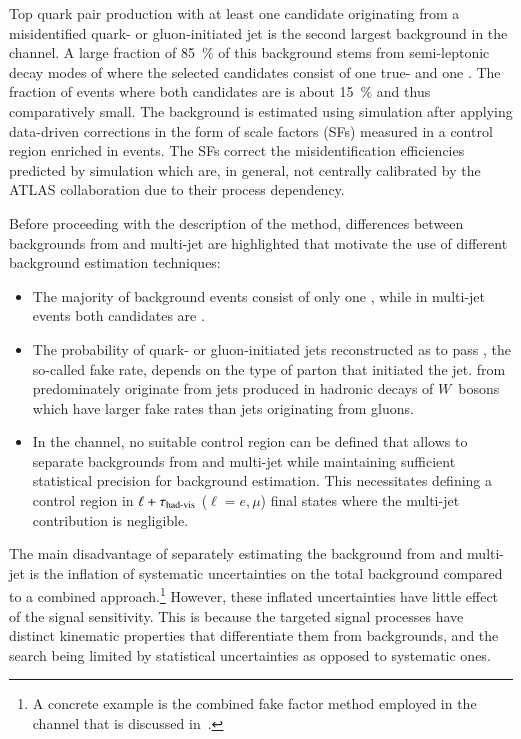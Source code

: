 Top quark pair production with at least one \tauhadvis candidate
originating from a misidentified quark- or gluon-initiated jet is the
second largest background in the \hadhad channel. A large fraction of
\SI{85}{\percent} of this background stems from semi-leptonic decay
modes of \ttbar where the selected \tauhadvis candidates consist of
one true- and one \faketauhadvis. The fraction of \ttbarFakes events
where both candidates are \faketauhadvis is about \SI{15}{\percent}
and thus comparatively small. The \ttbarFakes background is estimated
using simulation after applying data-driven corrections in the form of
\faketauhadvis scale factors (SFs) measured in a control region
enriched in \ttbar events. The SFs correct the \jettotauhadvis
misidentification efficiencies predicted by simulation which are, in
general, not centrally calibrated by the ATLAS collaboration due to
their process dependency.

Before proceeding with the description of the method, differences
between \faketauhadvis backgrounds from \ttbar and multi-jet are
highlighted that motivate the use of different background estimation
techniques:
\begin{itemize}

\item The majority of \ttbarFakes background events consist of only one
  \faketauhadvis, while in multi-jet events both candidates are \faketauhadvis.

\item The probability of quark- or gluon-initiated jets reconstructed
  as \tauhadvis to pass \tauid, the so-called fake rate, depends on
  the type of parton that initiated the jet. \Faketauhadvis from
  \ttbar predominately originate from jets produced in hadronic decays
  of $W$~bosons which have larger fake rates than jets originating
  from gluons.

\item In the \hadhad channel, no suitable \ttbarFakes control region
  can be defined that allows to separate \faketauhadvis backgrounds
  from \ttbar and multi-jet while maintaining sufficient statistical
  precision for background estimation. This necessitates defining a
  control region in $\ell + \tau_{\text{had-vis}}$ ($\ell = e, \mu$) final states
  where the multi-jet contribution is negligible.

\end{itemize}
The main disadvantage of separately estimating the \faketauhadvis
background from \ttbar and multi-jet is the inflation of systematic
uncertainties on the total \faketauhadvis background compared to a
combined approach.\footnote{A concrete example is the combined fake
  factor method employed in the \lephad channel that is discussed
  in~.} However, these inflated
uncertainties have little effect of the signal sensitivity. This is
because the targeted signal processes have distinct kinematic
properties that differentiate them from \faketauhadvis backgrounds,
and the search being limited by statistical uncertainties as opposed
to systematic ones.


